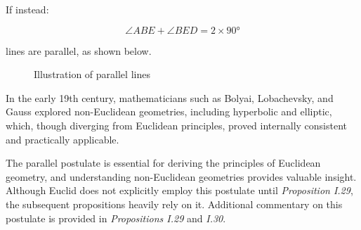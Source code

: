 If instead:

\[ \angle{ABE} + \angle{BED} = 2\times\ang{90}\] 

lines are parallel, as shown below.

\begin{figure}[h]
\centering
	\caption{Illustration of parallel lines}
\end{figure}

In the early 19th century, mathematicians such as Bolyai, Lobachevsky, and Gauss explored non-Euclidean geometries, including hyperbolic and elliptic, which, though diverging from Euclidean principles, proved internally consistent and practically applicable.

The parallel postulate is essential for deriving the principles of Euclidean geometry, and understanding non-Euclidean geometries provides valuable insight. Although Euclid does not explicitly employ this postulate until \textit{Proposition I.29}, the subsequent propositions heavily rely on it. Additional commentary on this postulate is provided in \textit{Propositions I.29} and \textit{I.30}.

\clearpage
